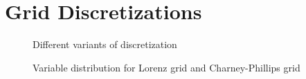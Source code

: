 \section{Grid Discretizations}
\begin{figure}[ht]
    \caption{Different variants of discretization}
    \label{fig:grid_discretization}
\end{figure}
\begin{figure}[ht]
    \caption{Variable distribution for Lorenz grid and Charney-Phillips grid}
    \label{fig:lorenz_cp}
\end{figure}

